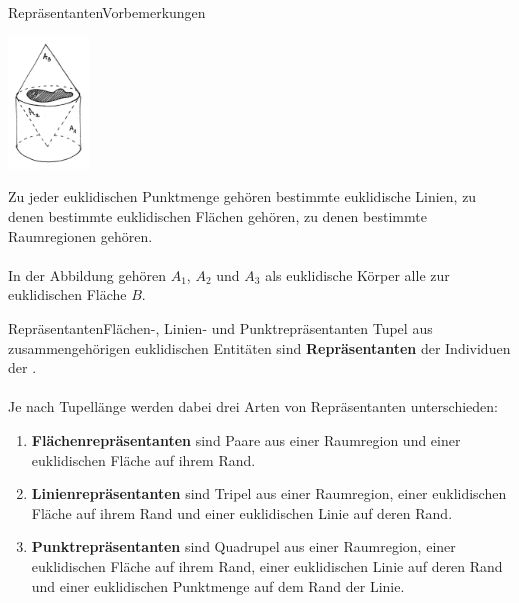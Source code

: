 \documentclass[10pt,xcolor={dvipsnames}]{beamer}
\begin{document}
\begin{frame}{Repräsentanten}{Vorbemerkungen}
    \parbox{0.2\textwidth}{\includegraphics[height=3.5cm]{img/objektaeq-flaechen_transparent.png}}
    \hfill\mbox{}\hfill
    \parbox{0.7\textwidth}{
        Zu jeder euklidischen Punktmenge gehören bestimmte euklidische Linien, zu denen bestimmte euklidischen Flächen gehören, zu denen bestimmte Raumregionen gehören.\\ \ \\
        In der Abbildung gehören $A_1$, $A_2$ und $A_3$ als euklidische Körper alle zur euklidischen Fläche $B$.
    }
\end{frame}


\begin{frame}{Repräsentanten}{Flächen-, Linien- und Punktrepräsentanten}
    Tupel aus zusammengehörigen euklidischen Entitäten sind \textbf{Repräsentanten} der Individuen der \strukt.\\ \ \\
    Je nach Tupellänge werden dabei drei Arten von Repräsentanten unterschieden:
    \begin{enumerate}
        \item \textbf{Flächenrepräsentanten}
            sind Paare aus einer Raumregion und einer euklidischen Fläche auf ihrem Rand.
        \item \textbf{Linienrepräsentanten}
            sind Tripel aus einer Raumregion, einer euklidischen Fläche auf ihrem Rand und einer euklidischen Linie auf deren Rand.
        \item \textbf{Punktrepräsentanten}
            sind Quadrupel aus einer Raumregion, einer euklidischen Fläche auf ihrem Rand, einer euklidischen Linie auf deren Rand und einer euklidischen Punktmenge auf dem Rand der Linie.%
    \end{enumerate}
\end{frame}
\end{document}
